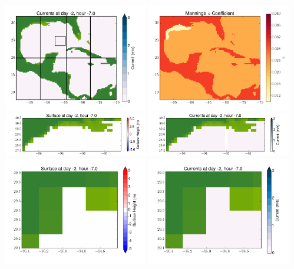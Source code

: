 \documentclass[11pt]{article}
\begin{document}
\includegraphics[width=0.475\textwidth]{frame0017fig2.png}
\vskip 10pt 
\includegraphics[width=0.475\textwidth]{frame0017fig3.png}
\includegraphics[width=0.475\textwidth]{frame0017fig4.png}
\vskip 10pt 
\includegraphics[width=0.475\textwidth]{frame0017fig5.png}
\includegraphics[width=0.475\textwidth]{frame0017fig6.png}
\vskip 10pt 
\includegraphics[width=0.475\textwidth]{frame0017fig7.png}
\end{document}
